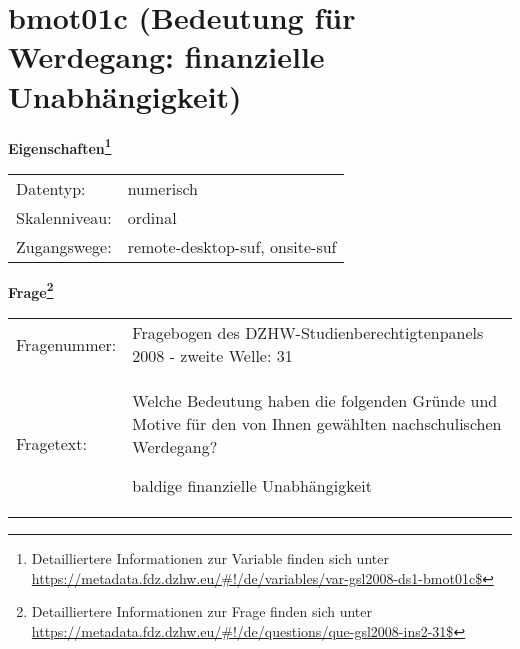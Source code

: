 
    \setcounter{footnote}{0}

    \vspace*{-1.8cm}
	\section{bmot01c (Bedeutung für Werdegang: finanzielle Unabhängigkeit)}
	\label{section:bmot01c}



    \vspace*{0.5cm}
    \noindent\textbf{Eigenschaften\footnote{Detailliertere Informationen zur Variable finden sich unter
		\url{https://metadata.fdz.dzhw.eu/\#!/de/variables/var-gsl2008-ds1-bmot01c$}}}\\
	\begin{tabularx}{\hsize}{@{}lX}
	Datentyp: & numerisch \\
	Skalenniveau: & ordinal \\
	Zugangswege: &
	  remote-desktop-suf, 
	  onsite-suf
 \\
    \end{tabularx}



				\vspace*{0.5cm}
                \noindent\textbf{Frage\footnote{Detailliertere Informationen zur Frage finden sich unter
		              \url{https://metadata.fdz.dzhw.eu/\#!/de/questions/que-gsl2008-ins2-31$}}}\\
				\begin{tabularx}{\hsize}{@{}lX}
					Fragenummer: &
					  Fragebogen des DZHW-Studienberechtigtenpanels 2008 - zweite Welle:
					  31
 \\
					Fragetext: & Welche Bedeutung haben die folgenden Gründe und Motive für den von Ihnen gewählten nachschulischen Werdegang?\par  baldige finanzielle Unabhängigkeit \\
				\end{tabularx}






